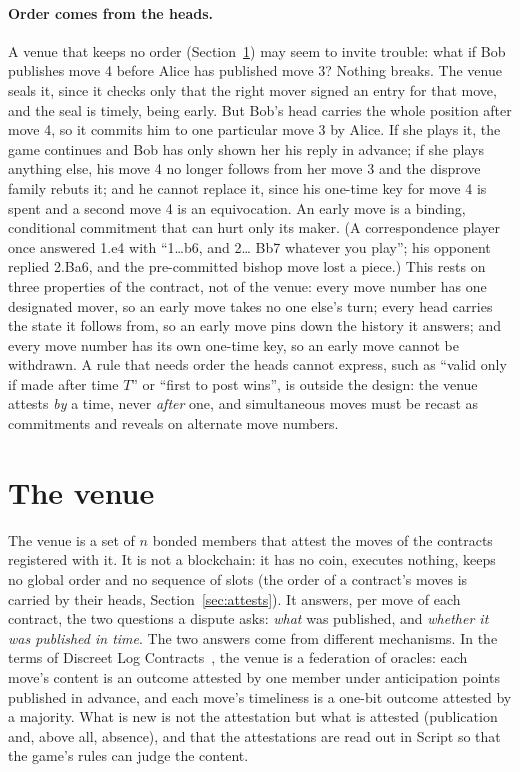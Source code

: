 \documentclass[11pt]{article}
\begin{document}
\paragraph{Order comes from the heads.} A venue that keeps no order
(Section~\ref{sec:venue}) may seem to invite trouble: what if Bob
publishes move 4 before Alice has published move 3? Nothing breaks. The
venue seals it, since it checks only that the right mover signed an
entry for that move, and the seal is timely, being early. But Bob's head
carries the whole position after move 4, so it commits him to one
particular move 3 by Alice. If she plays it, the game continues and Bob
has only shown her his reply in advance; if she plays anything else,
his move 4 no longer follows from her move 3 and the disprove family
rebuts it; and he cannot replace it, since his one-time key for move 4
is spent and a second move 4 is an equivocation. An early move is a
binding, conditional commitment that can hurt only its maker. (A
correspondence player once answered 1.e4 with ``1\ldots b6, and 2\ldots
Bb7 whatever you play''; his opponent replied 2.Ba6, and the
pre-committed bishop move lost a piece.) This rests on three
properties of the contract, not of the venue: every move number has one
designated mover, so an early move takes no one else's turn; every head
carries the state it follows from, so an early move pins down the
history it answers; and every move number has its own one-time key, so
an early move cannot be withdrawn. A rule that needs order the heads
cannot express, such as ``valid only if made after time $T$'' or ``first
to post wins'', is outside the design: the venue attests \emph{by} a
time, never \emph{after} one, and simultaneous moves must be recast as
commitments and reveals on alternate move numbers.

\section{The venue}
\label{sec:venue}

The venue is a set of $n$ bonded members that attest the moves of the
contracts registered with it. It is not a blockchain: it has no coin,
executes nothing, keeps no global order and no sequence of slots (the
order of a contract's moves is carried by their heads,
Section~\ref{sec:attests}). It
answers, per move of each contract, the two questions a dispute asks:
\emph{what} was published, and \emph{whether it was published in time}.
The two answers come from different mechanisms. In the terms of Discreet
Log Contracts~\cite{dlc}, the venue is a federation of oracles: each
move's content is an outcome attested by one member under anticipation
points published in advance, and each move's timeliness is a one-bit
outcome attested by a majority. What is new is not the attestation but
what is attested (publication and, above all, absence), and that the
attestations are read out in Script so that the game's rules can judge
the content.
\end{document}
